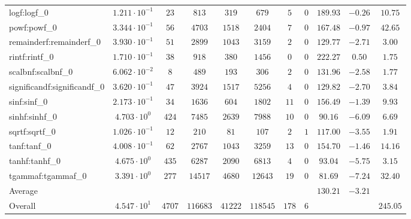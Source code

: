 \begin{tabular}{|l|c|c|c|c|c|c|c|c|c|c|}
logf:logf\_0                 & $ 1.211 \cdot 10^{-1} $ & $ 23     $ & $ 813    $ & $ 319   $ & $ 679    $ & $ 5   $ & $ 0 $ & $ 189.93      $ & $ -0.26   $ & $ 10.75   $ \\
powf:powf\_0                 & $ 3.344 \cdot 10^{-1} $ & $ 56     $ & $ 4703   $ & $ 1518  $ & $ 2404   $ & $ 7   $ & $ 0 $ & $ 167.48      $ & $ -0.97   $ & $ 42.65   $ \\
remainderf:remainderf\_0     & $ 3.930 \cdot 10^{-1} $ & $ 51     $ & $ 2899   $ & $ 1043  $ & $ 3159   $ & $ 2   $ & $ 0 $ & $ 129.77      $ & $ -2.71   $ & $ 3.00    $ \\
rintf:rintf\_0               & $ 1.710 \cdot 10^{-1} $ & $ 38     $ & $ 918    $ & $ 380   $ & $ 1456   $ & $ 0   $ & $ 0 $ & $ 222.27      $ & $ 0.50    $ & $ 1.75    $ \\
scalbnf:scalbnf\_0           & $ 6.062 \cdot 10^{-2} $ & $ 8      $ & $ 489    $ & $ 193   $ & $ 306    $ & $ 2   $ & $ 0 $ & $ 131.96      $ & $ -2.58   $ & $ 1.77    $ \\
significandf:significandf\_0 & $ 3.620 \cdot 10^{-1} $ & $ 47     $ & $ 3924   $ & $ 1517  $ & $ 5256   $ & $ 4   $ & $ 0 $ & $ 129.82      $ & $ -2.70   $ & $ 3.84    $ \\
sinf:sinf\_0                 & $ 2.173 \cdot 10^{-1} $ & $ 34     $ & $ 1636   $ & $ 604   $ & $ 1802   $ & $ 11  $ & $ 0 $ & $ 156.49      $ & $ -1.39   $ & $ 9.93    $ \\
sinhf:sinhf\_0               & $ 4.703 \cdot 10^{0}  $ & $ 424    $ & $ 7485   $ & $ 2639  $ & $ 7988   $ & $ 10  $ & $ 0 $ & $ 90.16       $ & $ -6.09   $ & $ 6.69    $ \\
sqrtf:sqrtf\_0               & $ 1.026 \cdot 10^{-1} $ & $ 12     $ & $ 210    $ & $ 81    $ & $ 107    $ & $ 2   $ & $ 1 $ & $ 117.00      $ & $ -3.55   $ & $ 1.91    $ \\
tanf:tanf\_0                 & $ 4.008 \cdot 10^{-1} $ & $ 62     $ & $ 2767   $ & $ 1043  $ & $ 3259   $ & $ 13  $ & $ 0 $ & $ 154.70      $ & $ -1.46   $ & $ 14.16   $ \\
tanhf:tanhf\_0               & $ 4.675 \cdot 10^{0}  $ & $ 435    $ & $ 6287   $ & $ 2090  $ & $ 6813   $ & $ 4   $ & $ 0 $ & $ 93.04       $ & $ -5.75   $ & $ 3.15    $ \\
tgammaf:tgammaf\_0           & $ 3.391 \cdot 10^{0}  $ & $ 277    $ & $ 14517  $ & $ 4680  $ & $ 12643  $ & $ 19  $ & $ 0 $ & $ 81.69       $ & $ -7.24   $ & $ 32.40   $ \\
\hline
Average                      & $                     $ & $        $ & $        $ & $       $ & $        $ & $     $ & $   $ & $ 130.21      $ & $ -3.21   $ & $         $ \\
\hline
Overall                      & $ 4.547 \cdot 10^{1}  $ & $ 4707   $ & $ 116683 $ & $ 41222 $ & $ 118545 $ & $ 178 $ & $ 6 $ & $             $ & $         $ & $ 245.05  $ \\
\hline
\end{tabular}
